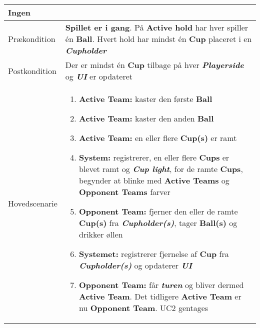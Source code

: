 \documentclass[Kravspecifikation/Kravspec_Main.tex]{subfiles}
\begin{document}
\begin{longtable}[]{@{}ll@{}}
\begin{minipage}[t]{0.47\columnwidth}
{Ingen}\strut
\end{minipage}\tabularnewline
\toprule
\begin{minipage}[t]{0.47\columnwidth}\raggedright
{Prækondition}\strut
\end{minipage} & \begin{minipage}[t]{0.47\columnwidth}\raggedright
{\textbf{Spillet er i gang}. På \textbf{Active hold} har hver spiller én \textbf{Ball}. Hvert hold har mindst én \textbf{Cup} placeret i en \textit{\textbf{Cupholder}}}\strut
\end{minipage}\tabularnewline
\toprule
\begin{minipage}[t]{0.47\columnwidth}\raggedright
{Postkondition}\strut
\end{minipage} & \begin{minipage}[t]{0.47\columnwidth}\raggedright
{Der er mindst én \textbf{Cup} tilbage på hver \textit{\textbf{Playerside}} og \textit{\textbf{UI}} er opdateret}\strut
\end{minipage}\tabularnewline
\toprule
\begin{minipage}[t]{0.47\columnwidth}\raggedright
{Hovedscenarie}\strut
\end{minipage} & \begin{minipage}[t]{0.47\columnwidth}\raggedright
\begin{enumerate}
\tightlist
\item
  {\textbf{Active Team:} kaster den første \textbf{Ball}}
\item
  {\textbf{Active Team:} kaster den anden \textbf{Ball}}
\item
  {\textbf{Active Team:} en eller flere \textbf{Cup(s)} er ramt 
  }
  \item
   {\textbf{System:} registrerer, en eller flere \textbf{Cups} er blevet ramt og \textit{\textbf{Cup light}}, for de ramte \textbf{Cups}, begynder at blinke med \textbf{Active Teams} og \textbf{Opponent Teams} farver}
\item
    {\textbf{Opponent Team:} fjerner den eller de ramte \textbf{Cup(s)} fra \textit{\textbf{Cupholder(s)}}, tager \textbf{Ball(s)} og drikker øllen}
\item 
    {\textbf{Systemet:} registrerer fjernelse af \textbf{Cup} fra \textit{\textbf{Cupholder(s)}} og opdaterer \textit{\textbf{UI}}}
\item  
    {\textbf{Opponent Team:} får \textbf{\textit{turen}} og bliver dermed \textbf{Active Team}. Det tidligere \textbf{Active Team} er nu \textbf{Opponent Team}. UC2 gentages}
\end{enumerate}\strut


\end{minipage}
\end{longtable}
\end{document}
